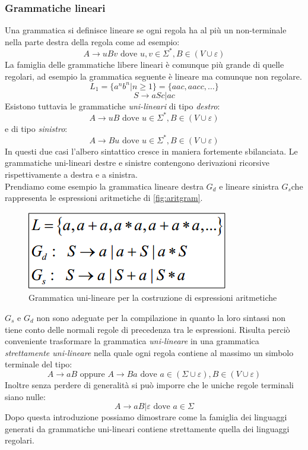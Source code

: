 \subsubsection{Grammatiche lineari}
Una grammatica si definisce lineare se ogni regola ha al più un non-terminale nella parte destra della regola come ad esempio:
$$A\rightarrow uBv \text{ dove } u,v \in \Sigma^*, B\in (V\cup\varepsilon)$$
La famiglia delle grammatiche libere lineari è comunque più grande di quelle regolari, ad esempio la grammatica seguente è lineare ma comunque non regolare.
$$L_1 = \{a^nb^n| n \geq 1 \} = \{aac,aacc,\dots \}$$
$$S\rightarrow aSc | ac$$
Esistono tuttavia le grammatiche \emph{uni-lineari} di tipo \emph{destro}:
$$A\rightarrow uB \text{ dove } u\in \Sigma^*,B\in(V\cup \varepsilon)$$
e di tipo \emph{sinistro}:
$$A\rightarrow Bu \text{ dove } u\in \Sigma^*,B\in(V\cup \varepsilon)$$
In questi due casi l'albero sintattico cresce in maniera fortemente sbilanciata. Le grammatiche uni-lineari destre e sinistre contengono derivazioni ricorsive rispettivamente a destra e a sinistra.\\
Prendiamo come esempio la grammatica lineare destra $ G_d $ e lineare sinistra $ G_s $che rappresenta le espressioni aritmetiche di \figurename \ref{fig:aritgram}.
\begin{figure}
	\centering
	\includegraphics[width=0.4\linewidth]{img/aritgram.png}
	\caption{Grammatica uni-lineare per la costruzione di espressioni aritmetiche}\label{fig:arigram}
\end{figure}
$ G_s $ e $ G_d $ non sono adeguate per la compilazione in quanto la loro sintassi non tiene conto delle normali regole di precedenza tra le espressioni. Risulta perciò conveniente trasformare la grammatica \emph{uni-lineare} in una grammatica \emph{strettamente uni-lineare} nella quale ogni regola contiene al massimo un simbolo terminale del tipo:
$$A\rightarrow aB \text{ oppure } A \rightarrow Ba \text{ dove } a\in(\Sigma \cup \varepsilon), B \in ( V\cup \varepsilon)$$
Inoltre senza perdere di generalità si può imporre che le uniche regole terminali siano nulle:
$$A\rightarrow aB | \varepsilon \text{ dove } a\in\Sigma$$
Dopo questa introduzione possiamo dimostrare come la famiglia dei linguaggi generati da grammatiche uni-lineari contiene strettamente quella dei linguaggi regolari.\\
